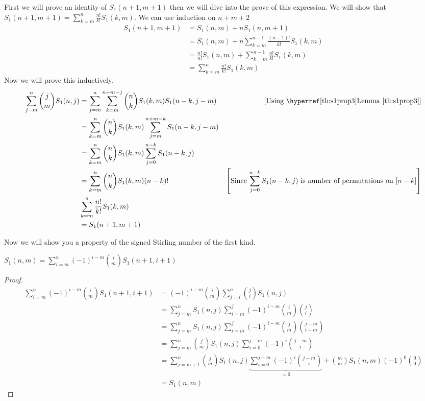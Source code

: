 \begin{alg-proof}
	First we will prove an identity of $S_1(n+1,m+1)$ then we will dive into the prove of this expression. We will show that  $S_1(n+1,m+1)=\sum\limits_{k=m}^n\frac{n!}{k!}S_1(k,m)$. We can use induction on $n+m+2$\begin{align*}
		S_1(n+1,m+1) & =S_1(n,m)+nS_1(n,m+1)                                          \\
		             & =S_1(n,m) +n\sum_{k=m}^{n-1}\frac{(n-1)!}{k!}S_1(k,m)          \\
		             & = \frac{n!}{n!}S_1(n,m) +\sum_{k=m}^{n-1}\frac{n!}{k!}S_1(k,m) \\
		             & =\sum_{k=m}^{n}\frac{n!}{k!}S_1(k,m)
	\end{align*}
	Now we will prove this inductively. 
	\begin{align*}
		\sum_{j-m}^n\binom{j}{m}S_1(n,j) & = \sum_{j=m}^n\sum_{k=m}^{n+m-j}\binom{n}{k}S_1(k,m)S_1(n-k,j-m) & [\text{Using \lmref{s1prop3}}]                                                                       \\
		                                 & = \sum_{k=m}^n\binom{n}{k}S_1(k,m)\sum_{j=m}^{n+m-k}S_1(n-k,j-m) &  \\
		                                 & = \sum_{k=m}^n\binom{n}{k}S_1(k,m)\sum_{j=0}^{n-k}S_1(n-k,j)     &  \\
		                                 & = \sum_{k=m}^n\binom{n}{k}S_1(k,m)(n-k)!                         & \lt[\text{Since $\displaystyle\sum_{j=0}^{n-k}S_1(n-k,j)$ is  number of permutations on $[n-k]$}\rt] \\
		                                 & \sum_{k=m}^n\frac{n!}{k!}S_1(k,m)                                &  \\
		                                 & = S_1(n+1,m+1)                                                   &
	\end{align*}

\end{alg-proof}

Now we will show you a property of the signed Stirling number of the first kind.
\begin{Theorem}{}{}
	$S_1(n,m)=\displaystyle\sum\limits_{i=m}^n(-1)^{i-m}\binom{i}{m}S_1(n+1,i+1)$
\end{Theorem}
\begin{proof}
	\begin{align*}
		\sum_{i=m}^n(-1)^{i-m}\binom{i}{m}S_1(n+1,i+1) & = (-1)^{i-m}\binom{i}{m}\sum_{j=i}^n\binom{j}{i}S_1(n,j)\\
		& = \sum_{j=m}^nS_1(n,j)\sum_{i=m}^j (-1)^{i-m}\binom{i}{m}\binom{j}{i}\\
		& = \sum_{j=m}^n S_1(n,j)\sum_{i=m}^j (-1)^{i-m}\binom{j}{m}\binom{j-m}{i-m}\\
		& = \sum_{j=m}^n \binom{j}{m}S_1(n,j)\sum_{i=0}^{j-m} (-1)^{i}\binom{j-m}{i}\\
		& = \sum_{j=m+1}^n \binom{j}{m}S_1(n,j)\underbrace{\sum_{i=0}^{j-m} (-1)^{i}\binom{j-m}{i}}_{=0}+\binom{m}{m}S_1(n,m)(-1)^0\binom{0}{0}\\
		& = S_1(n,m)
	\end{align*}
\end{proof}

